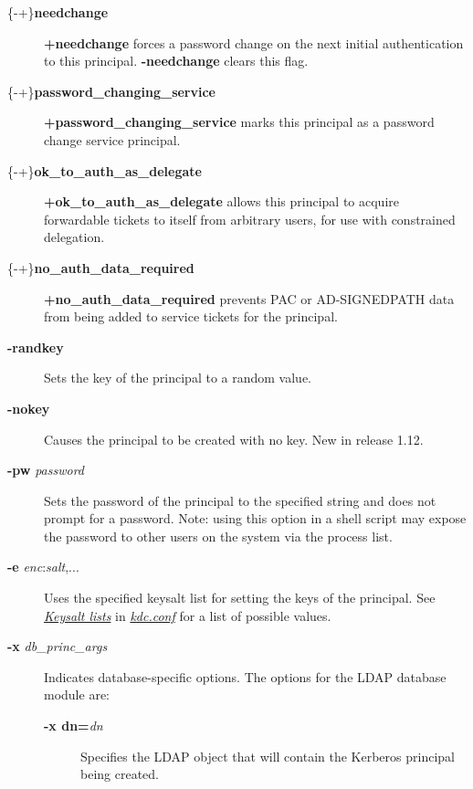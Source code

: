\documentclass[letterpaper,10pt,english]{sphinxmanual}
\begin{document}
\begin{description}
\item[{\{-\textbar{}+\}\textbf{needchange}}] \leavevmode
\textbf{+needchange} forces a password change on the next initial
authentication to this principal.  \textbf{-needchange} clears this
flag.

\item[{\{-\textbar{}+\}\textbf{password\_changing\_service}}] \leavevmode
\textbf{+password\_changing\_service} marks this principal as a password
change service principal.

\item[{\{-\textbar{}+\}\textbf{ok\_to\_auth\_as\_delegate}}] \leavevmode
\textbf{+ok\_to\_auth\_as\_delegate} allows this principal to acquire
forwardable tickets to itself from arbitrary users, for use with
constrained delegation.

\item[{\{-\textbar{}+\}\textbf{no\_auth\_data\_required}}] \leavevmode
\textbf{+no\_auth\_data\_required} prevents PAC or AD-SIGNEDPATH data from
being added to service tickets for the principal.

\item[{\textbf{-randkey}}] \leavevmode
Sets the key of the principal to a random value.

\item[{\textbf{-nokey}}] \leavevmode
Causes the principal to be created with no key.  New in release
1.12.

\item[{\textbf{-pw} \emph{password}}] \leavevmode
Sets the password of the principal to the specified string and
does not prompt for a password.  Note: using this option in a
shell script may expose the password to other users on the system
via the process list.

\item[{\textbf{-e} \emph{enc}:\emph{salt},...}] \leavevmode
Uses the specified keysalt list for setting the keys of the
principal.  See {\hyperref[admin/conf_files/kdc_conf:keysalt-lists]{\emph{Keysalt lists}}} in {\hyperref[admin/conf_files/kdc_conf:kdc-conf-5]{\emph{kdc.conf}}} for a
list of possible values.

\item[{\textbf{-x} \emph{db\_princ\_args}}] \leavevmode
Indicates database-specific options.  The options for the LDAP
database module are:
\begin{description}
\item[{\textbf{-x dn=}\emph{dn}}] \leavevmode
Specifies the LDAP object that will contain the Kerberos
principal being created.


\end{description}
\end{description}
\end{document}
